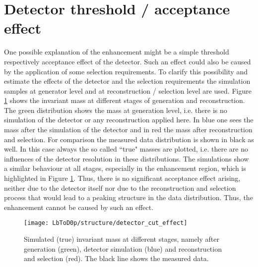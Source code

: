 \section{Detector threshold / acceptance effect}
One possible explanation of the enhancement might be a simple threshold respectively acceptance effect of the detector.
Such an effect could also be caused by the application of some selection requirements.
To clarify this possibility and estimate the effects of the detector and the selection requirements the simulation samples at generator level and at reconstruction / selection level are used.
Figure \ref{fig:detector_cut_effect} shows the invariant \Dz\proton mass at different stages of generation and reconstruction.
The green distribution shows the \Dz\proton mass at generation level, i.e. there is no simulation of the detector or any reconstruction applied here.
In blue one sees the \Dz\proton mass after the simulation of the detector and in red the mass after reconstruction and selection.
For comparison the measured data distribution is shown in black as well.
In this case always the so called ``true" masses are plotted, i.e. there are no influences of the detector resolution in these distributions.
The simulations show a similar behaviour at all stages, especially in the enhancement region, which is highlighted in Figure \ref{fig:detector_cut_effect}.
Thus, there is no significant acceptance effect arising, neither due to the detector itself nor due to the reconstruction and selection process that would lead to a peaking structure in the data distribution. 
Thus, the enhancement cannot be caused by such an effect.
\begin{figure}[ptb]
	\centering
	\texttt{[image: LbToD0p/structure/detector\_cut\_effect]}
	\caption{Simulated (true) invariant \Dz\proton mass at different stages, namely after generation (green), detector simulation (blue) and reconstruction and selection (red). The black line shows the measured data.}
	\label{fig:detector_cut_effect}
\end{figure}

